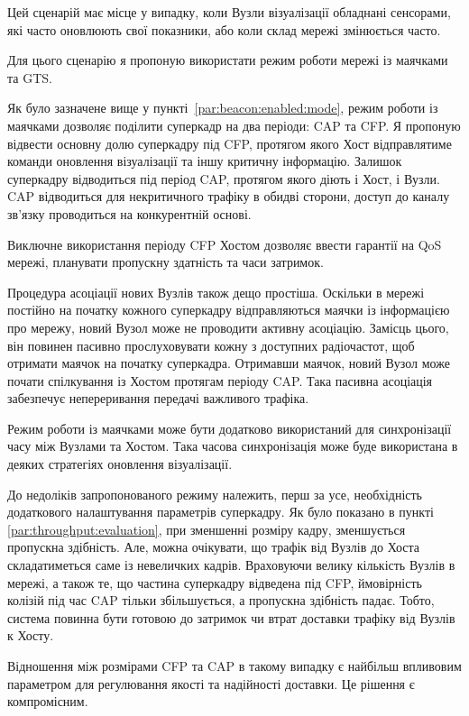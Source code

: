 \documentclass[a4paper,ukrainian,utf8,nocolumnsxix,floatsection]{eskdtext}
\begin{document}
Цей сценарій має місце у випадку, коли Вузли візуалізації обладнані сенсорами, які часто  оновлюють свої показники, або коли склад мережі змінюється часто.

Для цього сценарію я пропоную використати режим роботи мережі із маячками та GTS.

Як було зазначене вище у пункті~\ref{par:beacon:enabled:mode}, режим роботи із маячками дозволяє поділити суперкадр на два періоди: CAP та CFP. Я пропоную відвести основну долю суперкадру під CFP, протягом якого Хост відправлятиме команди оновлення візуалізації та іншу критичну інформацію. Залишок суперкадру відводиться під період CAP, протягом якого діють і Хост, і Вузли. CAP відводиться для некритичного трафіку в обидві сторони, доступ до каналу зв’язку проводиться на конкурентній основі. 

Виключне використання періоду CFP Хостом дозволяє ввести гарантії на QoS мережі, планувати пропускну здатність та часи затримок. 

Процедура асоціації нових Вузлів також дещо простіша. Оскільки в мережі постійно на початку кожного суперкадру відправляються маячки із інформацією про мережу, новий Вузол може не проводити активну асоціацію. Замісць цього, він повинен пасивно прослуховувати кожну з доступних радіочастот, щоб отримати маячок на початку суперкадра. Отримавши маячок, новий Вузол може почати спілкування із Хостом протягам періоду CAP. Така пасивна асоціація забезпечує непереривання передачі важливого трафіка.

Режим роботи із маячками може бути додатково використаний для синхронізації часу між Вузлами та Хостом. Така часова синхронізація може буде використана в деяких стратегіях оновлення візуалізації.

До недоліків запропонованого режиму належить, перш за усе, необхідність додаткового налаштування параметрів суперкадру. Як було показано в пункті \ref{par:throughput:evaluation}, при зменшенні розміру кадру, зменшується пропускна здібність. Але, можна очікувати, що трафік від Вузлів до Хоста складатиметься саме із невеличких кадрів. Враховуючи велику кількість Вузлів в мережі, а також те, що частина суперкадру відведена під CFP, ймовірність колізій під час CAP тільки збільшується, а пропускна здібність падає. Тобто, система повинна бути готовою до затримок чи втрат доставки трафіку від Вузлів к Хосту. 

Відношення між розмірами CFP та CAP в такому випадку є найбільш впливовим параметром для регулювання якості та надійності доставки. Це рішення є компромісним.
\end{document}
